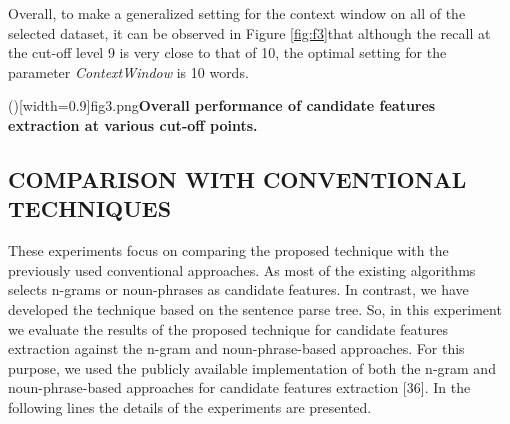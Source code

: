 \documentclass{ieeeaccess}
\begin{document}
\begin{enumerate}
\hspace{1 mm}Overall, to make a generalized setting for the context window on all of the selected dataset, it can be observed in  Figure \ref{fig:f3}that although the recall at the cut-off level 9 is very close to that of 10, the optimal setting for the parameter \textit{ContextWindow} is 10 words.

\Figure[!h] ()[width=0.9\linewidth]{fig3.png}{\textbf{Overall performance of candidate features extraction at
various cut-off points.\label{fig:f3}}}

\end{enumerate}

\subsection{COMPARISON WITH CONVENTIONAL TECHNIQUES}
These experiments focus on comparing the proposed technique with the previously used conventional approaches. As most of the existing algorithms selects n-grams or noun-phrases as candidate features. In contrast, we have developed the technique based on the sentence parse tree. So, in this experiment we evaluate the results of the proposed technique for candidate features extraction against the n-gram and noun-phrase-based approaches. For this purpose, we used the publicly available implementation of both the n-gram and noun-phrase-based approaches for candidate features extraction [36]. In the following lines the details of the experiments are presented.\\
\end{document}
